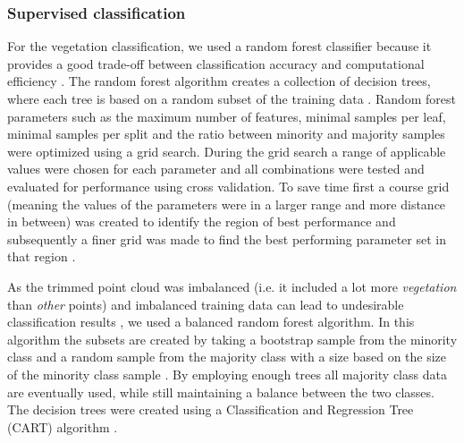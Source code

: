 \subsubsection{Supervised classification}
For the vegetation classification, we used a random forest classifier because it provides a good trade-off between classification accuracy and computational efficiency \citep{breiman2001random, weinmann2015semantic}. The random forest algorithm creates a collection of decision trees, where each tree is based on a random subset of the training data \citep{ho1998random}. Random forest parameters such as the maximum number of features, minimal samples per leaf, minimal samples per split and the ratio between minority and majority samples were optimized using a grid search. During the grid search a range of applicable values were chosen for each parameter and all combinations were tested and evaluated for performance using cross validation. To save time first a course grid (meaning the values of the parameters were in a larger range and more distance in between) was created to identify the region of best performance and subsequently a finer grid was made to find the best performing parameter set in that region \citep{hsu2003practical}.

As the trimmed point cloud was imbalanced (i.e. it included a lot more \textit{vegetation} than \textit{other} points) and imbalanced training data can lead to undesirable classification results \citep{he2009learning}, we used a balanced random forest algorithm. In this algorithm the subsets are created by taking a bootstrap sample from the minority class and a random sample from the majority class with a size based on the size of the minority class sample \citep{chen2004using}. By employing enough trees all majority class data are eventually used, while still maintaining a balance between the two classes. The decision trees were created using a Classification and Regression Tree (CART) algorithm \citep{breiman1984classification}. 

